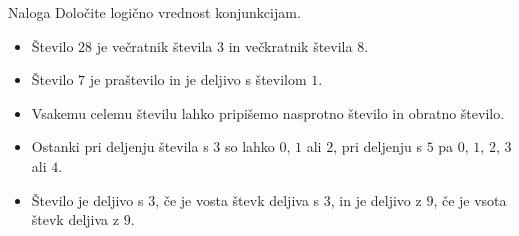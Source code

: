         \begin{frame}
            \begin{exampleblock}{Naloga}
                Določite logično vrednost konjunkcijam.
                \begin{itemize}
                    \item Število $28$ je večratnik števila $3$ in večkratnik števila $8$.
                    \item Število $7$ je praštevilo in je deljivo s številom $1$.
                    \item Vsakemu celemu številu lahko pripišemo nasprotno število in obratno število.
                    \item Ostanki pri deljenju števila s $3$ so lahko $0$, $1$ ali $2$, 
                        pri deljenju s $5$ pa $0$, $1$, $2$, $3$ ali $4$.
                    \item Število je deljivo s $3$, če je vosta števk deljiva s $3$, in je 
                        deljivo z $9$, če je vsota števk deljiva z $9$.
                \end{itemize}
            \end{exampleblock}
        \end{frame}

